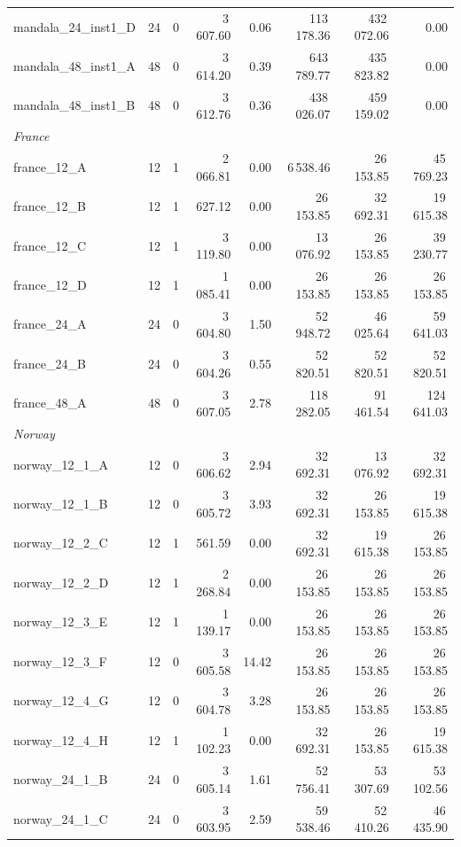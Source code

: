 \documentclass{article}
\begin{document}
\begin{table}[h!]
\begin{tabular}{@{}l r c r r r r r@{}}
mandala\_24\_inst1\_D & 24 & 0 & 3\,607.60 & 0.06 & 113\,178.36 & 432\,072.06 & 0.00 \\
mandala\_48\_inst1\_A & 48 & 0 & 3\,614.20 & 0.39 & 643\,789.77 & 435\,823.82 & 0.00 \\
mandala\_48\_inst1\_B & 48 & 0 & 3\,612.76 & 0.36 & 438\,026.07 & 459\,159.02 & 0.00 \\
\midrule
\multicolumn{8}{l}{\textit{France}} \\
\midrule
france\_12\_A & 12 & 1 & 2\,066.81 & 0.00 & 6\,538.46 & 26\,153.85 & 45\,769.23 \\
france\_12\_B & 12 & 1 & 627.12 & 0.00 & 26\,153.85 & 32\,692.31 & 19\,615.38 \\
france\_12\_C & 12 & 1 & 3\,119.80 & 0.00 & 13\,076.92 & 26\,153.85 & 39\,230.77 \\
france\_12\_D & 12 & 1 & 1\,085.41 & 0.00 & 26\,153.85 & 26\,153.85 & 26\,153.85 \\
france\_24\_A & 24 & 0 & 3\,604.80 & 1.50 & 52\,948.72 & 46\,025.64 & 59\,641.03 \\
france\_24\_B & 24 & 0 & 3\,604.26 & 0.55 & 52\,820.51 & 52\,820.51 & 52\,820.51 \\
france\_48\_A & 48 & 0 & 3\,607.05 & 2.78 & 118\,282.05 & 91\,461.54 & 124\,641.03 \\
\midrule
\multicolumn{8}{l}{\textit{Norway}} \\
\midrule
norway\_12\_1\_A & 12 & 0 & 3\,606.62 & 2.94 & 32\,692.31 & 13\,076.92 & 32\,692.31 \\
norway\_12\_1\_B & 12 & 0 & 3\,605.72 & 3.93 & 32\,692.31 & 26\,153.85 & 19\,615.38 \\
norway\_12\_2\_C & 12 & 1 & 561.59 & 0.00 & 32\,692.31 & 19\,615.38 & 26\,153.85 \\
norway\_12\_2\_D & 12 & 1 & 2\,268.84 & 0.00 & 26\,153.85 & 26\,153.85 & 26\,153.85 \\
norway\_12\_3\_E & 12 & 1 & 1\,139.17 & 0.00 & 26\,153.85 & 26\,153.85 & 26\,153.85 \\
norway\_12\_3\_F & 12 & 0 & 3\,605.58 & 14.42 & 26\,153.85 & 26\,153.85 & 26\,153.85 \\
norway\_12\_4\_G & 12 & 0 & 3\,604.78 & 3.28 & 26\,153.85 & 26\,153.85 & 26\,153.85 \\
norway\_12\_4\_H & 12 & 1 & 1\,102.23 & 0.00 & 32\,692.31 & 26\,153.85 & 19\,615.38 \\
norway\_24\_1\_B & 24 & 0 & 3\,605.14 & 1.61 & 52\,756.41 & 53\,307.69 & 53\,102.56 \\
norway\_24\_1\_C & 24 & 0 & 3\,603.95 & 2.59 & 59\,538.46 & 52\,410.26 & 46\,435.90 \\

\end{tabular}
\end{table}
\end{document}
